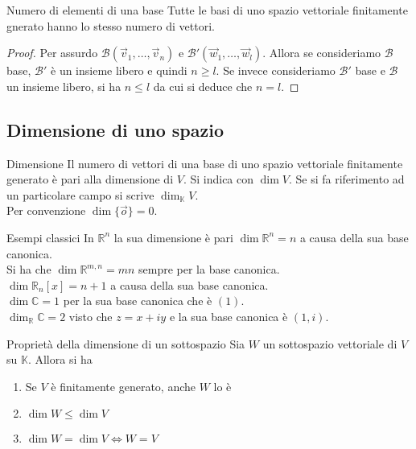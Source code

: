 \begin{SubThm}{Numero di elementi di una base}
  Tutte le basi di uno spazio vettoriale finitamente gnerato hanno lo stesso numero di
  vettori.
\end{SubThm}

\begin{proof}
  Per assurdo $\mathscr{B}(\vec{v}_1,\ldots,\vec{v}_n)$ e
  $\mathscr{B}'(\vec{w}_1,\ldots,\vec{w}_l)$. Allora se consideriamo $\mathscr{B}$ base,
  $\mathscr{B}'$ è un insieme libero e quindi $n\geq l$. Se invece consideriamo
  $\mathscr{B}'$ base e $\mathscr{B}$ un insieme libero, si ha $n\leq l$ da cui si
  deduce che $n=l$.
\end{proof}

\subsection{Dimensione di uno spazio}%
\label{sub:dimensione_di_uno_spazio}

\begin{Def}{Dimensione}
  Il numero di vettori di una base di uno spazio vettoriale finitamente generato è pari
  alla dimensione di $V$. Si indica con $\dim V$. Se si fa riferimento ad un particolare
  campo si scrive $\dim_{\mathbb{K}}V$.\\
  Per convenzione $\dim\{\vec{o}\}=0$.
\end{Def}

\begin{Ex}{Esempi classici}
  In $\mathbb{R}^n$ la sua dimensione è pari $\dim\mathbb{R}^n=n$ a causa della sua base
  canonica.\\
  Si ha che $\dim\mathbb{R}^{m,n}=mn$ sempre per la base canonica.\\
  $\dim\mathbb{R}_n[x]=n+1$ a causa della sua base canonica.\\
  $\dim\mathbb{C}=1$ per la sua base canonica che è $(1)$.\\
  $\dim_\mathbb{R}\mathbb{C}=2$ visto che $z = x+iy$ e la sua base canonica è $(1,i)$.
\end{Ex}

\begin{Thm}{Proprietà della dimensione di un
  sottospazio}\label{thm:spazio_dim_sottospazio}
  Sia $W$ un sottospazio vettoriale di $V$ su $\mathbb{K}$. Allora si ha
  \begin{enumerate}
    \item\label{thm:spazio_dim_sottospazio_1} Se $V$ è finitamente generato, anche $W$
      lo è
    \item\label{thm:spazio_dim_sottospazio_2} $\dim W\leq\dim V$
    \item\label{thm:spazio_dim_sottospazio_3} $\dim W = \dim V\iff W = V$
  \end{enumerate}
\end{Thm}

